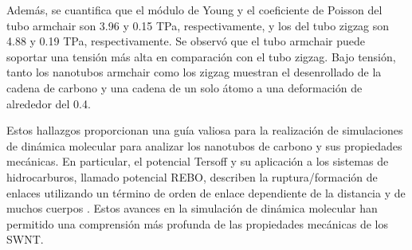 \documentclass[a4paper]{article}
\begin{document}
Además, se cuantifica que el módulo de Young y el coeficiente de Poisson del tubo armchair son 3.96 y 0.15 TPa, respectivamente, y los del tubo zigzag son 4.88 y 0.19 TPa, respectivamente. Se observó que el tubo armchair puede soportar una tensión más alta en comparación con el tubo zigzag. Bajo tensión, tanto los nanotubos armchair como los zigzag muestran el desenrollado de la cadena de carbono y una cadena de un solo átomo a una deformación de alrededor del 0.4.

Estos hallazgos proporcionan una guía valiosa para la realización de simulaciones de dinámica molecular para analizar los nanotubos de carbono y sus propiedades mecánicas. En particular, el potencial Tersoff y su aplicación a los sistemas de hidrocarburos, llamado potencial REBO, describen la ruptura/formación de enlaces utilizando un término de orden de enlace dependiente de la distancia y de muchos cuerpos \cite{irle2009milestones}. Estos avances en la simulación de dinámica molecular han permitido una comprensión más profunda de las propiedades mecánicas de los SWNT.
\end{document}

